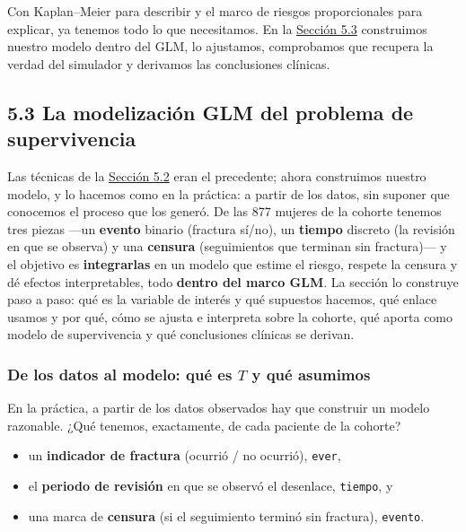\documentclass[
  letterpaper,
  DIV=11,
  numbers=noendperiod]{scrartcl}
\providecommand{\tightlist}{%
  \setlength{\itemsep}{0pt}\setlength{\parskip}{0pt}}\usepackage{longtable,booktabs,array}
\begin{document}
Con Kaplan--Meier para describir y el marco de riesgos proporcionales
para explicar, ya tenemos todo lo que necesitamos. En la
\protect\hyperlink{sec-u15-glm}{Sección 5.3} construimos nuestro modelo
dentro del GLM, lo ajustamos, comprobamos que recupera la verdad del
simulador y derivamos las conclusiones clínicas.

\hypertarget{sec-u15-glm}{%
\subsection{5.3 La modelización GLM del problema de
supervivencia}\label{sec-u15-glm}}

Las técnicas de la \protect\hyperlink{sec-u15-ph}{Sección 5.2} eran el
precedente; ahora construimos nuestro modelo, y lo hacemos como en la
práctica: a partir de los datos, sin suponer que conocemos el proceso
que los generó. De las 877 mujeres de la cohorte tenemos tres piezas
---un \textbf{evento} binario (fractura sí/no), un \textbf{tiempo}
discreto (la revisión en que se observa) y una \textbf{censura}
(seguimientos que terminan sin fractura)--- y el objetivo es
\textbf{integrarlas} en un modelo que estime el riesgo, respete la
censura y dé efectos interpretables, todo \textbf{dentro del marco GLM}.
La sección lo construye paso a paso: qué es la variable de interés y qué
supuestos hacemos, qué enlace usamos y por qué, cómo se ajusta e
interpreta sobre la cohorte, qué aporta como modelo de supervivencia y
qué conclusiones clínicas se derivan.

\hypertarget{sec-u15-anatomia}{%
\subsubsection{\texorpdfstring{De los datos al modelo: qué es \(T\) y
qué
asumimos}{De los datos al modelo: qué es T y qué asumimos}}\label{sec-u15-anatomia}}

En la práctica, a partir de los datos observados hay que construir un
modelo razonable. ¿Qué tenemos, exactamente, de cada paciente de la
cohorte?

\begin{itemize}
\tightlist
\item
  un \textbf{indicador de fractura} (ocurrió / no ocurrió),
  \texttt{ever},
\item
  el \textbf{periodo de revisión} en que se observó el desenlace,
  \texttt{tiempo}, y
\item
  una marca de \textbf{censura} (si el seguimiento terminó sin
  fractura), \texttt{evento}.
\end{itemize}
\end{document}
